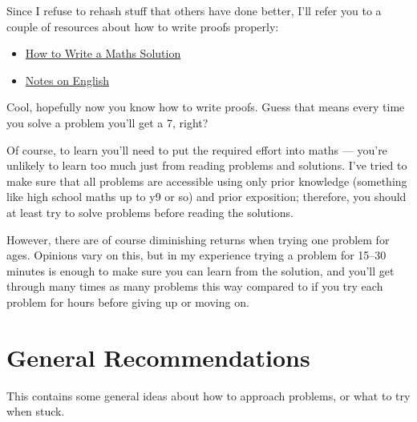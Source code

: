 Since I refuse to rehash stuff that others have done better, I'll refer you to a
couple of resources about how to write proofs properly:
\begin{itemize}
  \item
    \href{https://artofproblemsolving.com/news/articles/how-to-write-a-solution}
    {How to Write a Maths Solution}
  \item \href{https://web.evanchen.cc/handouts/english/english.pdf}{Notes on
    English}
\end{itemize}
Cool, hopefully now you know how to write proofs. Guess that means every time 
you solve a problem you'll get a 7, right?

Of course, to learn you'll need to put the required effort into maths --- you're
unlikely to learn too much just from reading problems and solutions. I've
tried to make sure that all problems are accessible using only prior knowledge
(something like high school maths up to y9 or so) and prior exposition;
therefore, you should at least try to solve problems before reading the
solutions.

However, there are of course diminishing returns when trying one
problem for ages. Opinions vary on this, but in my experience trying a problem
for 15--30 minutes is enough to make sure you can learn from the solution, and
you'll get through many times as many problems this way compared to if you try
each problem for hours before giving up or moving on.
\section*{General Recommendations}
This contains some general ideas about how to approach problems, or what to
try when stuck.

